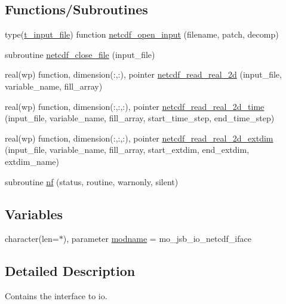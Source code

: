 \subsection*{Functions/\+Subroutines}
\begin{DoxyCompactItemize}
\item 
type(\hyperlink{structmo__jsb__io__netcdf__iface_1_1t__input__file}{t\+\_\+input\+\_\+file}) function \hyperlink{namespacemo__jsb__io__netcdf__iface_a62f76a91ba113d51746677418c103187}{netcdf\+\_\+open\+\_\+input} (filename, patch, decomp)
\item 
subroutine \hyperlink{namespacemo__jsb__io__netcdf__iface_a1e42c90ce288ce4489b6e472daa40d2e}{netcdf\+\_\+close\+\_\+file} (input\+\_\+file)
\item 
real(wp) function, dimension(\+:,\+:), pointer \hyperlink{namespacemo__jsb__io__netcdf__iface_a228681d1ececa8f44b717c01629fee9d}{netcdf\+\_\+read\+\_\+real\+\_\+2d} (input\+\_\+file, variable\+\_\+name, fill\+\_\+array)
\item 
real(wp) function, dimension(\+:,\+:,\+:), pointer \hyperlink{namespacemo__jsb__io__netcdf__iface_a4e62dfd3cc23b3747e5039db1110a5a0}{netcdf\+\_\+read\+\_\+real\+\_\+2d\+\_\+time} (input\+\_\+file, variable\+\_\+name, fill\+\_\+array, start\+\_\+time\+\_\+step, end\+\_\+time\+\_\+step)
\item 
real(wp) function, dimension(\+:,\+:,\+:), pointer \hyperlink{namespacemo__jsb__io__netcdf__iface_acc08a587eb91f00869119c81c06aea05}{netcdf\+\_\+read\+\_\+real\+\_\+2d\+\_\+extdim} (input\+\_\+file, variable\+\_\+name, fill\+\_\+array, start\+\_\+extdim, end\+\_\+extdim, extdim\+\_\+name)
\item 
subroutine \hyperlink{namespacemo__jsb__io__netcdf__iface_a14c4e6dbfc96b953416a81add4b76022}{nf} (status, routine, warnonly, silent)
\end{DoxyCompactItemize}
\subsection*{Variables}
\begin{DoxyCompactItemize}
\item 
character(len=$\ast$), parameter \hyperlink{namespacemo__jsb__io__netcdf__iface_aa929904f54cf60b8c7c6bc8be31257d0}{modname} = \textquotesingle{}mo\+\_\+jsb\+\_\+io\+\_\+netcdf\+\_\+iface\textquotesingle{}
\end{DoxyCompactItemize}


\subsection{Detailed Description}
Contains the interface to io. 

